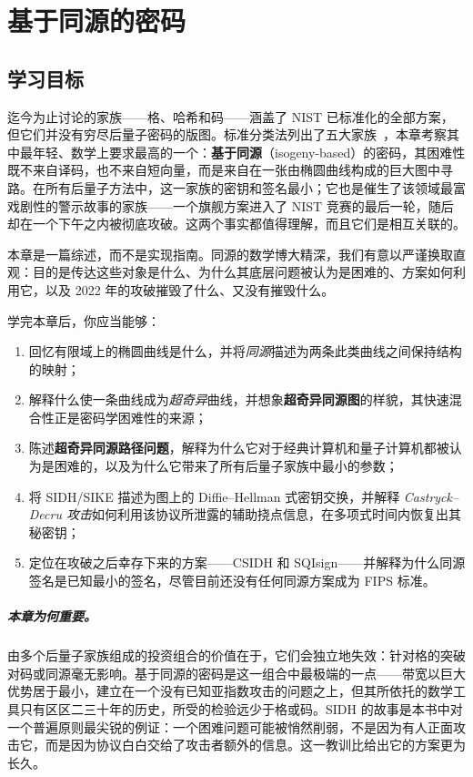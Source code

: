 \chapter{基于同源的密码}
\label{ch:isogeny}

\section{学习目标}

迄今为止讨论的家族——格、哈希和码——涵盖了 NIST 已标准化的全部方案，但它们并没有穷尽后量子密码的版图。标准分类法列出了五大家族~\cite{bernstein2009}，本章考察其中最年轻、数学上要求最高的一个：\textbf{基于同源}（isogeny-based）的密码，其困难性既不来自译码，也不来自短向量，而是来自在一张由椭圆曲线构成的巨大图中寻路。在所有后量子方法中，这一家族的密钥和签名最小；它也是催生了该领域最富戏剧性的警示故事的家族——一个旗舰方案进入了 NIST 竞赛的最后一轮，随后却在一个下午之内被彻底攻破。这两个事实都值得理解，而且它们是相互关联的。

本章是一篇综述，而不是实现指南。同源的数学博大精深，我们有意以严谨换取直观：目的是传达这些对象是什么、为什么其底层问题被认为是困难的、方案如何利用它，以及 2022 年的攻破摧毁了什么、又没有摧毁什么。

学完本章后，你应当能够：

\begin{enumerate}
  \item 回忆有限域上的椭圆曲线是什么，并将\emph{同源}描述为两条此类曲线之间保持结构的映射；
  \item 解释什么使一条曲线成为\emph{超奇异}曲线，并想象\textbf{超奇异同源图}的样貌，其快速混合性正是密码学困难性的来源；
  \item 陈述\textbf{超奇异同源路径问题}，解释为什么它对于经典计算机和量子计算机都被认为是困难的，以及为什么它带来了所有后量子家族中最小的参数；
  \item 将 SIDH/SIKE 描述为图上的 Diffie--Hellman 式密钥交换，并解释 \emph{Castryck--Decru 攻击}如何利用该协议所泄露的辅助挠点信息，在多项式时间内恢复出其秘密钥；
  \item 定位在攻破之后幸存下来的方案——CSIDH 和 SQIsign——并解释为什么同源签名是已知最小的签名，尽管目前还没有任何同源方案成为 FIPS 标准。
\end{enumerate}

\paragraph{本章为何重要。}
由多个后量子家族组成的投资组合的价值在于，它们会独立地失效：针对格的突破对码或同源毫无影响。基于同源的密码是这一组合中最极端的一点——带宽以巨大优势居于最小，建立在一个没有已知亚指数攻击的问题之上，但其所依托的数学工具只有区区二三十年的历史，所受的检验远少于格或码。SIDH 的故事是本书中对一个普遍原则最尖锐的例证：一个困难问题可能被悄然削弱，不是因为有人正面攻击它，而是因为协议白白交给了攻击者额外的信息。这一教训比给出它的方案更为长久。

